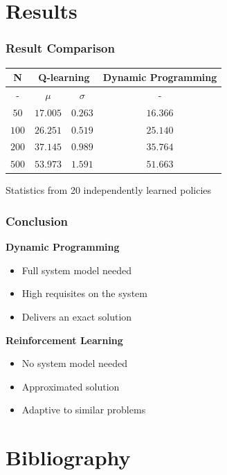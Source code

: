 \documentclass{beamer}
\begin{document}
\section{Results}

\begin{frame}
	\frametitle{Result Comparison}
	\centering
	\begin{tabular}{ |c|c|c|c| } 
		\hline
		N& \multicolumn{2}{c|}{Q-learning} & Dynamic Programming\\ 
		\hline
		-& $\mu$ & $\sigma$ & -\\ 
		\hline
		$50$ & $17.005$ & $0.263$ & $16.366$ \\ 
		\hline
		$100$ & $26.251$ & $0.519$ & $25.140$ \\ 
		\hline
		$200$ & $37.145$ & $0.989$ & $35.764$ \\ 
		\hline
		$500$ & $53.973$ & $1.591$ & $51.663$ \\ 
		\hline	
	\end{tabular}
	
	\vspace{0.5cm}
	\small Statistics from 20 independently learned policies
\end{frame}

\begin{frame}
	\frametitle{Conclusion}
	\vspace{-0.3cm}
	\textbf{Dynamic Programming}
	\begin{itemize}
		\item Full system model needed
		\item High requisites on the system
		\item Delivers an exact solution
	\end{itemize}
	\textbf{Reinforcement Learning}
	\begin{itemize}
		\item No system model needed
		\item Approximated solution
		\item Adaptive to similar problems
	\end{itemize}
	
	
	
\end{frame}

\section{Bibliography}
\begin{frame}
	\printbibliography
\end{frame}

\end{document}
